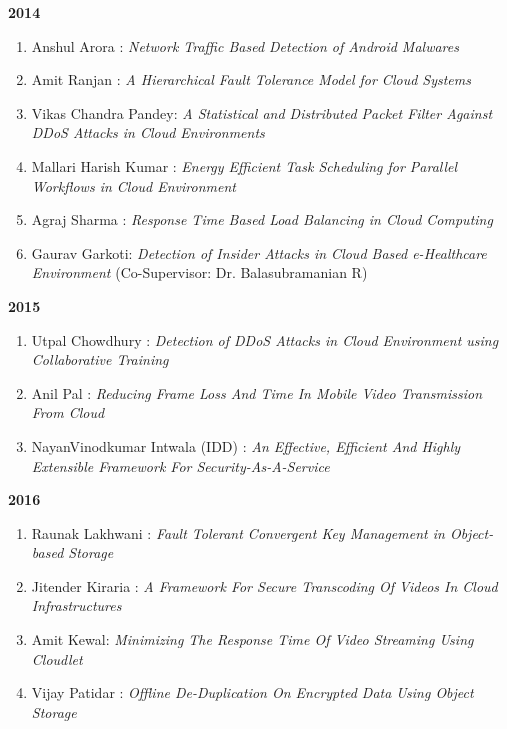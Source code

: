 \textbf{2014}

\begin{enumerate} [label=(MT\arabic*)., resume] 

\item		Anshul Arora : 	\textit{	Network Traffic Based Detection of Android Malwares}	
\item		Amit Ranjan : 	\textit{	A Hierarchical Fault Tolerance Model for Cloud Systems}	
\item     Vikas Chandra Pandey: 	\textit{ A Statistical and Distributed Packet Filter Against DDoS Attacks in Cloud Environments} 
\item		Mallari Harish Kumar : 	\textit{	Energy Efficient Task Scheduling for Parallel Workflows in Cloud Environment}	
\item		Agraj Sharma : 	\textit{	Response Time Based Load Balancing in Cloud Computing} 
\item		Gaurav Garkoti: 	\textit{	Detection of Insider Attacks in Cloud Based e-Healthcare Environment} (Co-Supervisor: Dr. Balasubramanian R)
\end{enumerate}

\textbf{2015}

\begin{enumerate} [label=(MT\arabic*)., resume] 
\item		Utpal Chowdhury : 	\textit{	Detection of DDoS Attacks in Cloud Environment using Collaborative Training}
\item		Anil Pal : 	\textit{	Reducing Frame Loss And Time In Mobile Video Transmission From Cloud}	
\item		NayanVinodkumar Intwala (IDD) : 	\textit{	An Effective, Efficient And Highly Extensible Framework For Security-As-A-Service}	
\end{enumerate}

\textbf{2016}

\begin{enumerate} [label=(MT\arabic*)., resume] 
\item		Raunak Lakhwani : 	\textit{Fault Tolerant Convergent Key Management in Object-based Storage}
\item		Jitender Kiraria : 	\textit{	A Framework For Secure Transcoding Of Videos In Cloud Infrastructures}
\item		Amit Kewal: 	\textit{	Minimizing The Response Time Of Video Streaming Using Cloudlet}
\item		Vijay Patidar : 	\textit{	Offline De-Duplication On Encrypted Data Using Object Storage}	
\end{enumerate}

